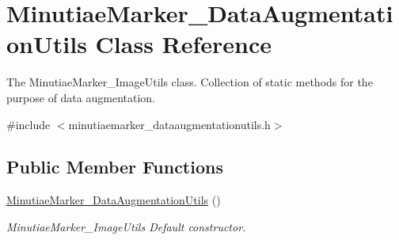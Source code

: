 \hypertarget{class_minutiae_marker___data_augmentation_utils}{}\section{Minutiae\+Marker\+\_\+\+Data\+Augmentation\+Utils Class Reference}
\label{class_minutiae_marker___data_augmentation_utils}


The Minutiae\+Marker\+\_\+\+Image\+Utils class. Collection of static methods for the purpose of data augmentation.  




{\ttfamily \#include $<$minutiaemarker\+\_\+dataaugmentationutils.\+h$>$}

\subsection*{Public Member Functions}
\begin{DoxyCompactItemize}
\item 
\mbox{\label{class_minutiae_marker___data_augmentation_utils_ae3a58ce9cb541d26ff2b072e1dac4667}} 
\mbox{\hyperlink{class_minutiae_marker___data_augmentation_utils_ae3a58ce9cb541d26ff2b072e1dac4667}{Minutiae\+Marker\+\_\+\+Data\+Augmentation\+Utils}} ()
\begin{DoxyCompactList}\small\item\em Minutiae\+Marker\+\_\+\+Image\+Utils Default constructor. \end{DoxyCompactList}\end{DoxyCompactItemize}
